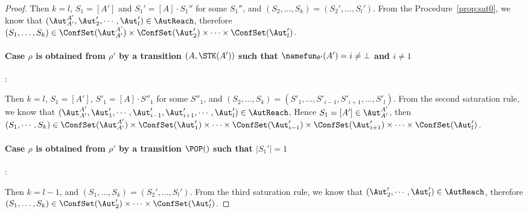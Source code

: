 \begin{proof}
Then $k = l$, $S_1=[A']$ and $S_1'=[A]\cdot S_1''$ for some $S_1''$, and $(S_2,\dots,S_k)=(S_2',\dots,S_l')$.
From the Procedure~\ref{prop:sat0}, we know that $(\Aut_{A'}^{A'},\Aut_2',\cdots,\Aut_l')\in\AutReach$, 
therefore $(S_1,\dots,S_k)\in\ConfSet(\Aut_{A'}^{A'})\times\ConfSet(\Aut_2')\times\cdots\times\ConfSet(\Aut_l')$.
\paragraph{Case $\rho$ is obtained from $\rho'$ by a transition $(A,\STK(A'))$ such that $\namefun_{\theta'}(A')=i\neq\bot$ and $i\neq 1$}: 

Then $k = l$, $S_1 = [A']$, $S'_1 = [A] \cdot S''_1$  for some $S''_1$, and $(S_2, \dots, S_k) = (S'_1, \dots, S'_{i-1}, S'_{i+1}, \dots, S'_l)$. From the second saturation rule, we know that $(\Aut_{A'}^{A'},\Aut_{1}',\cdots,\Aut_{i-1}',\Aut_{i+1}',\cdots,\Aut_{l}')\in\AutReach$,
        Hence $S_1=[A']\in\Aut_{A'}^{A'}$, then $(S_1,\cdots,S_k)\in\ConfSet(\Aut_{A'}^{A'})\times\ConfSet(\Aut_1')\times\cdots\times\ConfSet(\Aut_{i-1}')\times\ConfSet(\Aut_{i+1}')\times\cdots\times\ConfSet(\Aut_{l}')$.
\paragraph{Case $\rho$ is obtained from $\rho'$ by a transition $\POP()$ such that $|S_1'|=1$}: 

Then $k = l - 1$, and $(S_1,\dots,S_k)=(S_2',\dots,S_l')$.
From the third saturation rule, we know that $(\Aut_2',\cdots,\Aut_l')\in\AutReach$, 
therefore $(S_1,\dots,S_k)\in\ConfSet(\Aut_2')\times\cdots\times\ConfSet(\Aut_l')$.

\end{proof}
